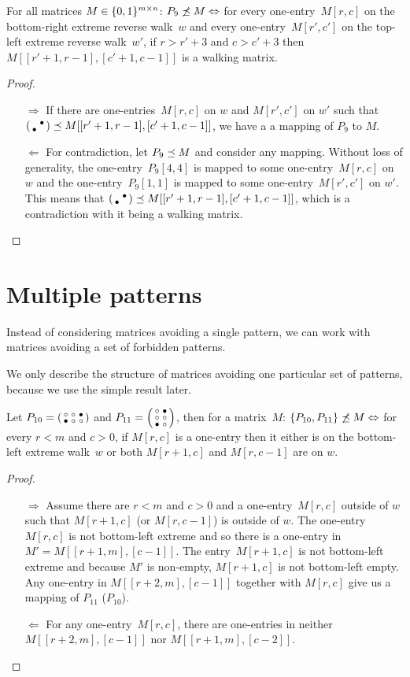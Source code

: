 \begin{prop}
For all matrices $M\in\{0,1\}^{m\times n}$: $P_9\not\preceq M\Leftrightarrow$ for every one-entry~$M[r,c]$ on the bottom-right extreme reverse walk~$w$ and every one-entry~$M[r',c']$ on the top-left extreme reverse walk~$w'$, if $r>r'+3$ and $c>c'+3$ then $M[[r'+1,r-1],[c'+1,c-1]]$ is a walking matrix.
\end{prop}
\begin{proof}
\begin{itemize}
	\item[$\Rightarrow$] If there are one-entries~$M[r,c]$ on $w$ and $M[r',c']$ on $w'$ such that $\left(\begin{smallmatrix} &\bullet\\\bullet& \end{smallmatrix}\right)\preceq M[[r'+1,r-1],[c'+1,c-1]]$, we have a a mapping of $P_9$ to $M$.
	\item[$\Leftarrow$] For contradiction, let $P_9\preceq M$ and consider any mapping. Without loss of generality, the one-entry~$P_9[4,4]$ is mapped to some one-entry~$M[r,c]$ on $w$ and the one-entry~$P_9[1,1]$ is mapped to some one-entry~$M[r',c']$ on $w'$. This means that $\left(\begin{smallmatrix} &\bullet\\\bullet& \end{smallmatrix}\right)\preceq M[[r'+1,r-1],[c'+1,c-1]]$, which is a contradiction with it being a walking matrix. \qedhere
\end{itemize}
\end{proof}

\section{Multiple patterns}
Instead of considering matrices avoiding a single pattern, we can work with matrices avoiding a set of forbidden patterns.

We only describe the structure of matrices avoiding one particular set of patterns, because we use the simple result later.

\begin{prop}
\label{prop:twopatterns}
Let $P_{10}=\left(\begin{smallmatrix}\circ&\circ&\bullet\\\bullet&\circ&\circ\end{smallmatrix}\right)$ and $P_{11}=\left(\begin{smallmatrix}\circ&\bullet\\\circ&\circ\\\bullet&\circ\end{smallmatrix}\right)$, then for a matrix~$M$: $\{P_{10},P_{11}\}\not\preceq M\Leftrightarrow$ for every $r<m$ and $c>0$, if $M[r,c]$ is a one-entry then it either is on the bottom-left extreme walk~$w$ or both $M[r+1,c]$ and $M[r,c-1]$ are on $w$.
\end{prop}
\begin{proof}
\begin{itemize}
	\item[$\Rightarrow$] Assume there are $r<m$ and $c>0$ and a one-entry~$M[r,c]$ outside of $w$ such that $M[r+1,c]$ (or $M[r,c-1]$) is outside of $w$. The one-entry~$M[r,c]$ is not bottom-left extreme and so there is a one-entry in $M'=M[[r+1,m],[c-1]]$. The entry~$M[r+1,c]$ is not bottom-left extreme and because $M'$ is non-empty, $M[r+1,c]$ is not bottom-left empty. Any one-entry in $M[[r+2,m],[c-1]]$ together with $M[r,c]$ give us a mapping of $P_{11}$ ($P_{10}$).
	\item[$\Leftarrow$] For any one-entry~$M[r,c]$, there are one-entries in neither $M[[r+2,m],[c-1]]$ nor $M[[r+1,m],[c-2]]$. \qedhere
\end{itemize}
\end{proof}
